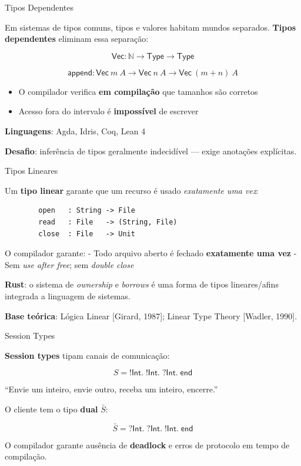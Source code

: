 \begin{frame}{Tipos Dependentes}

    Em sistemas de tipos comuns, tipos e valores habitam mundos separados.
    \textbf{Tipos dependentes} eliminam essa separação:

    \[\mathsf{Vec} : \mathbb{N} \to \mathsf{Type} \to \mathsf{Type}\]

    \[\mathsf{append} : \mathsf{Vec}\ m\ A \to \mathsf{Vec}\ n\ A \to \mathsf{Vec}\ (m + n)\ A\]

    \begin{itemize}

        \item
        O compilador verifica \textbf{em compilação} que tamanhos são corretos
        \item
        Acesso fora do intervalo é \textbf{impossível} de escrever
    \end{itemize}

    \textbf{Linguagens}: Agda, Idris, Coq, Lean 4

    \textbf{Desafio}: inferência de tipos geralmente indecidível --- exige
    anotações explícitas.
\end{frame}

\begin{frame}[fragile]{Tipos Lineares}

    Um \textbf{tipo linear} garante que um recurso é usado \emph{exatamente
    uma vez}:

    \begin{lstlisting}
        open   : String -> File
        read   : File   -> (String, File)
        close  : File   -> Unit
    \end{lstlisting}

    O compilador garante: - Todo arquivo aberto é fechado \textbf{exatamente
    uma vez} - Sem \emph{use after free}; sem \emph{double close}

    \textbf{Rust}: o sistema de \emph{ownership} e \emph{borrows} é uma
    forma de tipos lineares/afins integrada a linguagem de sistemas.

    \textbf{Base teórica}: Lógica Linear {[}Girard, 1987{]}; Linear Type
    Theory {[}Wadler, 1990{]}.
\end{frame}

\begin{frame}{Session Types}

    \textbf{Session types} tipam canais de comunicação:

    \[S = \mathsf{!Int}.\; \mathsf{!Int}.\; \mathsf{?Int}.\; \mathsf{end}\]

    ``Envie um inteiro, envie outro, receba um inteiro, encerre.''

    O cliente tem o tipo \textbf{dual} \(\bar{S}\):

    \[\bar{S} = \mathsf{?Int}.\; \mathsf{?Int}.\; \mathsf{!Int}.\; \mathsf{end}\]

    O compilador garante ausência de \textbf{deadlock} e erros de protocolo
    em tempo de compilação.
\end{frame}


